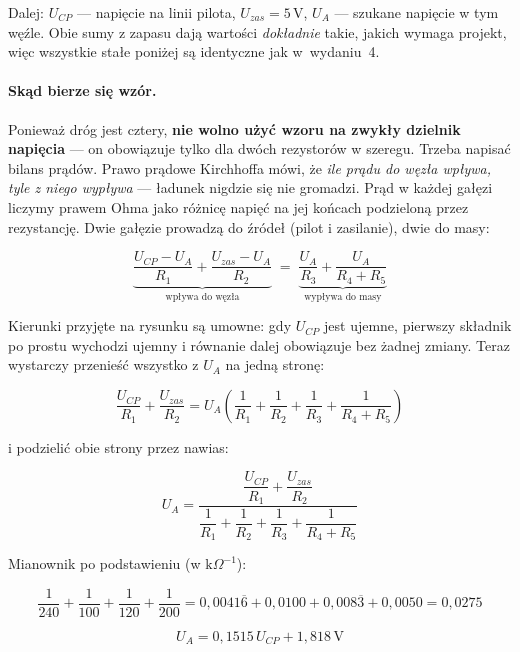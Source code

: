 \documentclass[a4paper,11pt]{article}
\newcommand{\volt}{\,\mathrm{V}}
\begin{document}
Dalej: $U_{CP}$ --- napięcie na linii pilota, $U_{zas}=5\volt$, $U_A$ --- szukane
napięcie w tym węźle. Obie sumy z zapasu dają wartości \emph{dokładnie} takie, jakich
wymaga projekt, więc wszystkie stałe poniżej są identyczne jak w~wydaniu~4.

\paragraph{Skąd bierze się wzór.} Ponieważ dróg jest cztery, \textbf{nie wolno użyć
wzoru na zwykły dzielnik napięcia} --- on obowiązuje tylko dla dwóch rezystorów
w szeregu. Trzeba napisać bilans prądów. Prawo prądowe Kirchhoffa mówi, że
\emph{ile prądu do węzła wpływa, tyle z niego wypływa} --- ładunek nigdzie się nie
gromadzi. Prąd w każdej gałęzi liczymy prawem Ohma jako różnicę napięć na jej
końcach podzieloną przez rezystancję. Dwie gałęzie prowadzą do źródeł (pilot
i zasilanie), dwie do masy:

\begin{equation}
\underbrace{\frac{U_{CP}-U_A}{R_1}+\frac{U_{zas}-U_A}{R_2}}_{\text{wpływa do węzła}}
\;=\;
\underbrace{\frac{U_A}{R_3}+\frac{U_A}{R_4+R_5}}_{\text{wypływa do masy}}
\label{eq:bilans}
\end{equation}

Kierunki przyjęte na rysunku są umowne: gdy $U_{CP}$ jest ujemne, pierwszy
składnik po prostu wychodzi ujemny i równanie dalej obowiązuje bez żadnej zmiany.
Teraz wystarczy przenieść wszystko z $U_A$ na jedną stronę:

\[
\frac{U_{CP}}{R_1}+\frac{U_{zas}}{R_2}
= U_A\left(\frac{1}{R_1}+\frac{1}{R_2}+\frac{1}{R_3}+\frac{1}{R_4+R_5}\right)
\]

i podzielić obie strony przez nawias:

\begin{equation}
U_A=\frac{\dfrac{U_{CP}}{R_1}+\dfrac{U_{zas}}{R_2}}
         {\dfrac{1}{R_1}+\dfrac{1}{R_2}+\dfrac{1}{R_3}+\dfrac{1}{R_4+R_5}}
\label{eq:wezelA}
\end{equation}

Mianownik po podstawieniu (w $\mathrm{k}\Omega^{-1}$):

\[
\frac{1}{240}+\frac{1}{100}+\frac{1}{120}+\frac{1}{200}
=0{,}0041\overline{6}+0{,}0100+0{,}008\overline{3}+0{,}0050=0{,}0275
\]

\begin{equation}
\boxed{\;U_A=0{,}1515\,U_{CP}+1{,}818\volt\;}
\label{eq:przelicznik}
\end{equation}
\end{document}

